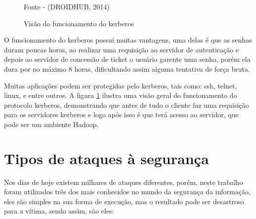 \begin{figure}[htbp!] 
\begin{center}
\caption{Visão do funcionamento do kerberos }
\small{Fonte - (DROIDHUB, 2014)}
\label{Fig:Visão do funcionamento do kerberos}
\end{center} 
\end{figure}

O funcionamento do kerberos possui muitas vantagens, uma delas é que as senhas duram poucas horas, ao realizar uma requisição ao servidor de autenticação e depois ao servidor de concessão de ticket o usuário garente uma senha, porém ela dura por no máximo 8 horas, dificultando assim alguma tentativa de força bruta. 

Muitas aplicações podem ser protegidas pelo kerberos, tais como: ssh, telnet, linux, e entre outros. A figura \ref{Fig:Visão do funcionamento do kerberos} ilustra uma visão geral do funcionamento do protocolo kerberos, demonstrando que antes de tudo o cliente faz uma requisição para os servidores kerberos e logo após isso é que terá acesso ao servidor, que pode ser um ambiente Hadoop.

\section{Tipos de ataques à segurança}

Nos dias de hoje existem milhares de ataques diferentes, porém, neste trabalho foram utilizados três dos mais conhecidos no mundo da segurança da informação, eles são simples na sua forma de execução, mas o resultado pode ser desastroso para a vítima, sendo assim, são eles:

